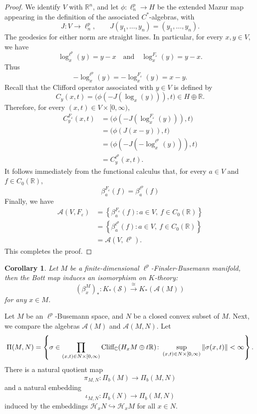 \documentclass{article}
\theoremstyle{plain}
\newtheorem{corollary}[theorem]{Corollary}
\theoremstyle{definition}
\theoremstyle{remark}
\def\A{\mathcal A}
\def\H{\mathcal H}
\def\IR{\mathbb R}
\def\IC{\mathbb C}
\def\Cl{\textup{Cliff}_{\IC}}
\def\S{\mathcal S}
\begin{document}
	\begin{proof}
		We identify $V$ with $\mathbb R^n$, and let $\phi:\ell_n^p\to H$ be the extended Mazur map appearing in the definition of the associated $C^*$-algebras, with
		\[
		J:V\longrightarrow \ell_n^p,\qquad
		J(y_1,\ldots,y_n)=(y_1,\ldots,y_n).
		\]
		The geodesics for either norm are straight lines.
		In particular, for every $x,y\in V$, we have
		\[
		\log_x^{\ell^p}(y)=y-x
		\quad\text{and}\quad
		\log_x^{F_\varepsilon}(y)=y-x.
		\]
		Thus
		\[
		-\log_x^{\ell^p}(y)
		=
		-\log_x^{F_\varepsilon}(y)
		=x-y.
		\]
		Recall that the Clifford operator associated with $y\in V$ is defined by
		\[
		C_y(x,t)
		=
		\bigl(\phi(-J(\log_x(y))),t\bigr)
		\in H\oplus\mathbb R.
		\]
		Therefore, for every $(x,t)\in V\times[0,\infty)$,
		\[
		\begin{aligned}
			C_y^{F_\varepsilon}(x,t)
			&=
			\bigl(\phi(-J(\log_x^{F_\varepsilon}(y))),t\bigr)\\
			&=
			\bigl(\phi(J(x-y)),t\bigr)\\
			&=
			\bigl(\phi(-J(-\log_x^{\ell^p}(y))),t\bigr)\\
			&=
			C_y^{\ell^p}(x,t).
		\end{aligned}
		\]
		It follows immediately from the functional calculus that, for every $a\in V$ and $f\in C_0(\mathbb R)$,
		\[
		\beta_a^{F_\varepsilon}(f)
		=
		\beta_a^{\ell^p}(f)
		\]
		Finally, we have
		\[
		\begin{aligned}
			\mathcal A(V,F_\varepsilon)
			&=\left\{
			\beta_a^{F_\varepsilon}(f):
			a\in V,\ f\in C_0(\mathbb R)
			\right\}\\
			&=\left\{
			\beta_a^{\ell^p}(f):
			a\in V,\ f\in C_0(\mathbb R)
			\right\}\\
			&=\mathcal A(V,\ell^p).
		\end{aligned}
		\]
		This completes the proof.
	\end{proof}
	\begin{corollary}\label{bottisoM}Let $M$ be a finite-dimensional $\ell^p$-Finsler-Busemann manifold, then the Bott map induces an isomorphism on $K$-theory:
		$$(\beta_x^M)_*:K_*(\S)\xrightarrow{\cong} K_*(\A(M))$$
		for any $x\in M$.
	\end{corollary}
	
	Let $M$ be an $\ell^p$-Busemann space, and $N$ be a closed convex subset of $M$. Next, we compare the algebras $\A(M)$ and $\A(M,N)$. Let
	\[
	\Pi(M,N) = \left\{ \sigma \in \prod_{(x,t) \in N \times [0,\infty) } \Cl(H_x M \oplus t \IR ) \colon \sup_{(x,t) \in N \times [0,\infty)} \| \sigma({x,t}) \| < \infty \right\}.
	\]
	There is a natural quotient map 
	\[
	\pi_{M,N} \colon \Pi_b(M) \to \Pi_b(M,N)
	\]
	and a natural embedding
	\[
	\iota_{M, N} \colon \Pi_b(N) \to \Pi_b(M,N)
	\]
	induced by the embeddings $\H_x N \hookrightarrow \H_x M$ for all $x \in N$. 
	
\end{document}
